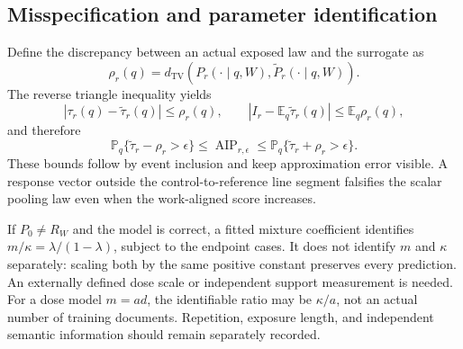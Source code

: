 \documentclass[11pt,letterpaper]{article}
\theoremstyle{definition}\newtheorem{definition}[theorem]{Definition}
\newcommand{\TV}{d_{\mathrm{TV}}}
\newcommand{\AIP}{\operatorname{AIP}}
\newcommand{\E}{\mathbb{E}}
\newcommand{\Prob}{\mathbb{P}}
\begin{document}
\subsection{Misspecification and parameter identification}
Define the discrepancy between an actual exposed law and the surrogate as
\begin{equation}
\rho_r(q)=\TV(P_r(\cdot\mid q,W),\widetilde P_r(\cdot\mid q,W)).
\end{equation}
The reverse triangle inequality yields
\begin{equation}
|\tau_r(q)-\widetilde\tau_r(q)|\le\rho_r(q),
\qquad |I_r-\E_q\widetilde\tau_r(q)|\le\E_q\rho_r(q),
\label{eq:robust}
\end{equation}
and therefore
\begin{equation}
\Prob_q\{\widetilde\tau_r-\rho_r>\epsilon\}
\le\AIP_{r,\epsilon}
\le\Prob_q\{\widetilde\tau_r+\rho_r>\epsilon\}.
\label{eq:aiprobust}
\end{equation}
These bounds follow by event inclusion and keep approximation error visible. A response vector outside the control-to-reference line segment falsifies the scalar pooling law even when the work-aligned score increases.

If $P_0\ne R_W$ and the model is correct, a fitted mixture coefficient identifies $m/\kappa=\lambda/(1-\lambda)$, subject to the endpoint cases. It does not identify $m$ and $\kappa$ separately: scaling both by the same positive constant preserves every prediction. An externally defined dose scale or independent support measurement is needed. For a dose model $m=ad$, the identifiable ratio may be $\kappa/a$, not an actual number of training documents. Repetition, exposure length, and independent semantic information should remain separately recorded.
\end{document}
